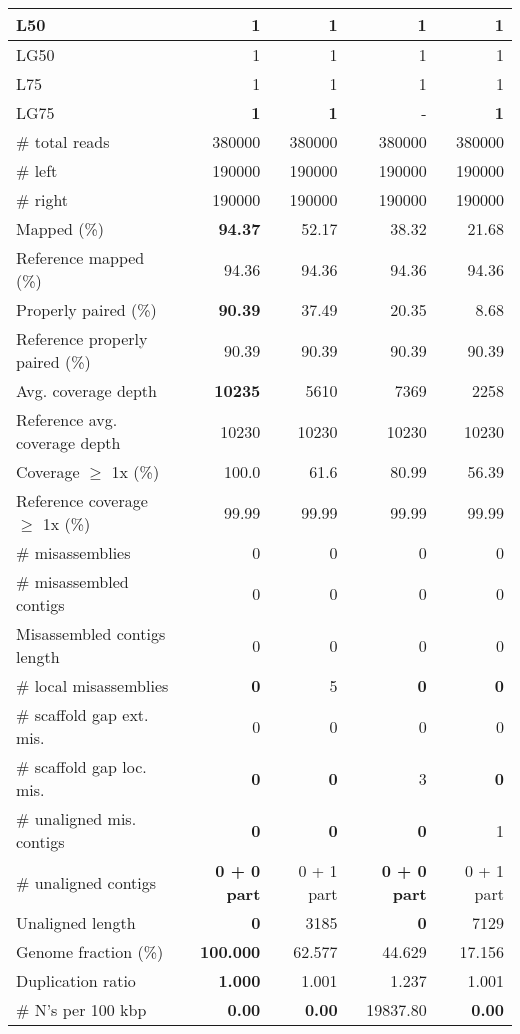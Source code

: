 \documentclass[12pt,a4paper]{article}
\begin{document}
\begin{table}[ht]
\begin{center}
\begin{tabular}{|l*{4}{|r}|}
L50 & 1 & 1 & 1 & 1 \\ \hline
LG50 & 1 & 1 & 1 & 1 \\ \hline
L75 & 1 & 1 & 1 & 1 \\ \hline
LG75 & {\bf 1} & {\bf 1} & - & {\bf 1} \\ \hline
\# total reads & 380000 & 380000 & 380000 & 380000 \\ \hline
\# left & 190000 & 190000 & 190000 & 190000 \\ \hline
\# right & 190000 & 190000 & 190000 & 190000 \\ \hline
Mapped (\%) & {\bf 94.37} & 52.17 & 38.32 & 21.68 \\ \hline
Reference mapped (\%) & 94.36 & 94.36 & 94.36 & 94.36 \\ \hline
Properly paired (\%) & {\bf 90.39} & 37.49 & 20.35 & 8.68 \\ \hline
Reference properly paired (\%) & 90.39 & 90.39 & 90.39 & 90.39 \\ \hline
Avg. coverage depth & {\bf 10235} & 5610 & 7369 & 2258 \\ \hline
Reference avg. coverage depth & 10230 & 10230 & 10230 & 10230 \\ \hline
Coverage $\geq$ 1x (\%) & 100.0 & 61.6 & 80.99 & 56.39 \\ \hline
Reference coverage $\geq$ 1x (\%) & 99.99 & 99.99 & 99.99 & 99.99 \\ \hline
\# misassemblies & 0 & 0 & 0 & 0 \\ \hline
\# misassembled contigs & 0 & 0 & 0 & 0 \\ \hline
Misassembled contigs length & 0 & 0 & 0 & 0 \\ \hline
\# local misassemblies & {\bf 0} & 5 & {\bf 0} & {\bf 0} \\ \hline
\# scaffold gap ext. mis. & 0 & 0 & 0 & 0 \\ \hline
\# scaffold gap loc. mis. & {\bf 0} & {\bf 0} & 3 & {\bf 0} \\ \hline
\# unaligned mis. contigs & {\bf 0} & {\bf 0} & {\bf 0} & 1 \\ \hline
\# unaligned contigs & {\bf 0 + 0 part} & 0 + 1 part & {\bf 0 + 0 part} & 0 + 1 part \\ \hline
Unaligned length & {\bf 0} & 3185 & {\bf 0} & 7129 \\ \hline
Genome fraction (\%) & {\bf 100.000} & 62.577 & 44.629 & 17.156 \\ \hline
Duplication ratio & {\bf 1.000} & 1.001 & 1.237 & 1.001 \\ \hline
\# N's per 100 kbp & {\bf 0.00} & {\bf 0.00} & 19837.80 & {\bf 0.00} \\ \hline

\end{tabular}
\end{center}
\end{table}
\end{document}
